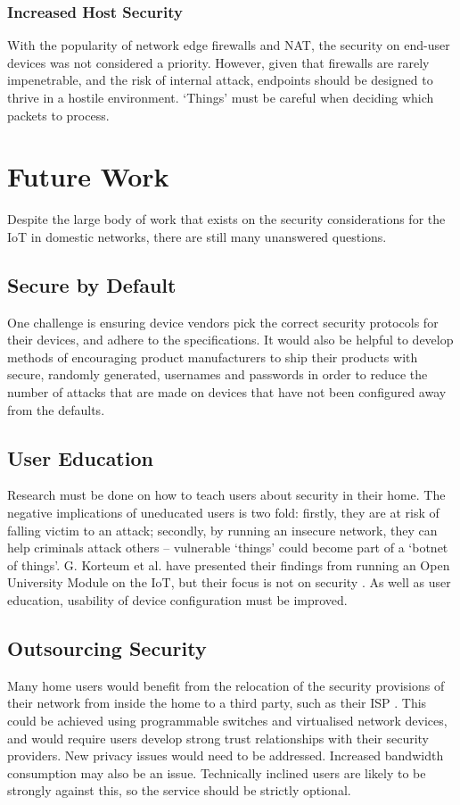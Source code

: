 \documentclass[10pt,journal,compsoc]{IEEEtran}
\begin{document}
\subsubsection{Increased Host Security}
With the popularity of network edge firewalls and NAT, the security on end-user
devices was not considered a priority. However, given that firewalls are rarely
impenetrable, and the risk of internal attack, endpoints should be designed to
thrive in a hostile environment. `Things' must be careful when deciding which
packets to process.


\section{Future Work}
Despite the large body of work that exists on the security considerations for
the IoT in domestic networks, there are still many unanswered questions. 

\subsection{Secure by Default}
One challenge is ensuring device vendors pick the correct security protocols
for their devices, and adhere to the specifications. It would also be helpful
to develop methods of encouraging product manufacturers to ship their products
with secure, randomly generated, usernames and passwords in order to reduce the
number of attacks that are made on devices that have not been configured away
from the defaults.

\subsection{User Education}
Research must be done on how to teach users about security in their home. The
negative implications of uneducated users is two fold: firstly, they are at
risk of falling victim to an attack; secondly, by running an insecure network,
they can help criminals attack others -- vulnerable `things' could become part
of a `botnet of things'. G. Korteum et al. have presented their findings from
running an Open University Module on the IoT, but their focus is not on
security \cite{Kortuem2013}. As well as user education, usability of device
configuration must be improved. 

\subsection{Outsourcing Security}
Many home users would benefit from the relocation of the security provisions of
their network from inside the home to a third party, such as their ISP
\cite{Kritzinger2013}. This could be achieved using programmable switches and
virtualised network devices, and would require users develop strong trust
relationships with their security providers. New privacy issues would need to
be addressed. Increased bandwidth consumption may also be an issue. Technically
inclined users are likely to be strongly against this, so the service should
be strictly optional.
\end{document}
